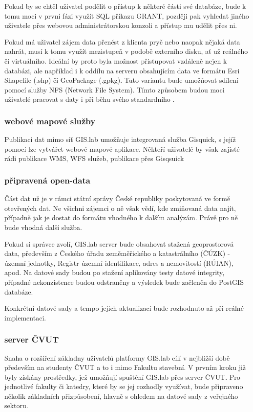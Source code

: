 Pokud by se chtěl uživatel podělit o přístup k některé části své databáze, bude k tomu moci v první fázi využít SQL příkazu GRANT, později pak vyhledat jiného uživatele přes webovou administrátorskou konzoli a přístup mu udělit přes ni.

Pokud má uživatel zájem data přenést z klienta pryč nebo naopak nějaká data nahrát, musí k tomu využít mezistupeň v podobě externího disku, ať už reálného či virtuálního. Ideální by proto byla možnost přistupovat vzdáleně nejen k databázi, ale například i k oddílu na serveru obsahujícím data ve formátu Esri Shapefile (.shp) či GeoPackage (.gpkg). Tuto variantu bude umožňovat sdílení pomocí služby NFS (Network File System). Tímto způsobem budou moci uživatelé pracovat s daty i při běhu svého standardního . 

\subsubsection{webové mapové služby}

Publikaci dat mimo síť GIS.lab umožňuje integrovaná služba Gisquick, s jejíž pomocí lze vytvářet webové mapové aplikace. Někteří uživatelé by však zajisté rádi 
publikace WMS, WFS služeb, 
publikace přes Gisqsuick

\subsubsection{připravená open-data}

Část dat už je v rámci státní správy České republiky poskytovaná ve formě otevřených dat. Ne všichni zájemci o ně však vědí, kde zmiňovaná data najít, případně jak je dostat do formátu vhodného k dalším analýzám. Právě pro ně bude vhodná další služba. 

Pokud si správce zvolí, GIS.lab server bude obsahovat stažená geoprostorová data, především z Českého úřadu zeměměřického a katastrálního (ČÚZK) - územní jednotky, Registr územní identifikace, adres a nemovitostí (RÚIAN), apod. Na datové sady budou po stažení aplikovány testy datové integrity, případné nekonzistence budou odstraněny a výsledek bude začleněn do PostGIS databáze. 

Konkrétní datové sady a tempo jejich aktualizací bude rozhodnuto až při reálné implementaci.

\subsubsection{server ČVUT}
Snaha o rozšíření základny uživatelů platformy GIS.lab cílí v nejbližší době především na studenty ČVUT a to i mimo Fakultu stavební. V prvním kroku již byly získány prostředky, jež umožňují spuštění GIS.lab přes server ČVUT. Pro jednotlivé fakulty či katedry, které by se jej rozhodly využívat, bude připraveno několik základních přizpůsobení, hlavně s ohledem na datové sady z veřejného sektoru.

